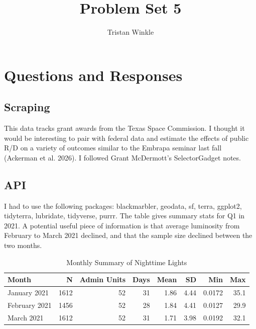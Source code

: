 \documentclass[12pt]{article}
\title{Problem Set 5}
\author{Tristan Winkle}
\date{}
\begin{document}
\maketitle

\section{Questions and Responses}

\subsection*{Scraping}

\noindent This data tracks grant awards from the Texas Space Commission. I thought it would be interesting to pair with federal data and estimate the effects of public R/D on a variety of outcomes similar to the Embrapa seminar last fall (Ackerman et al. 2026). I followed Grant McDermott's SelectorGadget notes. 


\subsection*{API} I had to use the following packages: blackmarbler, geodata, sf, terra, ggplot2, tidyterra, lubridate, tidyverse, purrr. The table gives summary stats for Q1 in 2021. A potential useful piece of information is that average luminosity from February to March 2021 declined, and that the sample size declined between the two months. 


\begin{table}[!htbp]
\centering
\caption{Monthly Summary of Nighttime Lights}
\vspace{0.5em}
\begin{minipage}{0.82\textwidth}
\centering
\begin{tabular}{lrrrrrrr}
\toprule
Month & N & Admin Units & Days & Mean & SD & Min & Max \\
\midrule
January 2021  & 1612 & 52 & 31 & 1.86 & 4.44 & 0.0172 & 35.1 \\
February 2021 & 1456 & 52 & 28 & 1.84 & 4.41 & 0.0127 & 29.9 \\
March 2021    & 1612 & 52 & 31 & 1.71 & 3.98 & 0.0192 & 32.1 \\
\bottomrule
\end{tabular}

\vspace{0.5em}
\footnotesize
\end{minipage}
\end{table}




\end{document}
